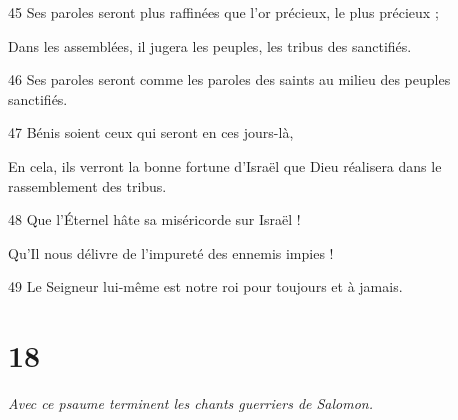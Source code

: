 \par 45 Ses paroles seront plus raffinées que l'or précieux, le plus précieux ;
\par     Dans les assemblées, il jugera les peuples, les tribus des sanctifiés.
\par 46 Ses paroles seront comme les paroles des saints au milieu des peuples sanctifiés.
\par 47 Bénis soient ceux qui seront en ces jours-là,
\par     En cela, ils verront la bonne fortune d'Israël que Dieu réalisera dans le rassemblement des tribus.
\par 48 Que l'Éternel hâte sa miséricorde sur Israël !
\par     Qu'Il nous délivre de l'impureté des ennemis impies !
\par 49 Le Seigneur lui-même est notre roi pour toujours et à jamais.

\chapter{18}

\par \textit{Avec ce psaume terminent les chants guerriers de Salomon.}

